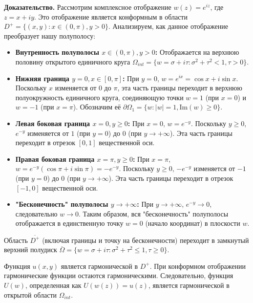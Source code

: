 \documentclass[12pt, a4paper]{article}
\begin{document}
	\textbf{Доказательство.}
	Рассмотрим комплексное отображение $w(z) = e^{iz}$, где $z = x+iy$. Это отображение является конформным в области $D^+ = \{(x,y): x \in (0,\pi), y > 0\}$. Анализируем, как данное отображение преобразует нашу полуполосу:
	\begin{itemize}
		\item \textbf{Внутренность полуполосы $x \in (0,\pi), y > 0$:} Отображается на верхнюю половину открытого единичного круга $\Omega_{int} = \{w = \sigma + i\tau : \sigma^2 + \tau^2 < 1, \tau > 0\}$.
		\item \textbf{Нижняя граница $y=0, x \in [0,\pi]$:} При $y=0$, $w = e^{ix} = \cos x + i\sin x$. Поскольку $x$ изменяется от $0$ до $\pi$, эта часть границы переходит в верхнюю полуокружность единичного круга, соединяющую точки $w=1$ (при $x=0$) и $w=-1$ (при $x=\pi$). Обозначим её $\partial \Omega_1 = \{w : |w|=1, \mathrm{Im}(w) \ge 0\}$.
		\item \textbf{Левая боковая граница $x=0, y \ge 0$:} При $x=0$, $w = e^{-y}$. Поскольку $y \ge 0$, $e^{-y}$ изменяется от $1$ (при $y=0$) до $0$ (при $y \to +\infty$). Эта часть границы переходит в отрезок $[0,1]$ вещественной оси.
		\item \textbf{Правая боковая граница $x=\pi, y \ge 0$:} При $x=\pi$, $w = e^{-y}(\cos\pi + i\sin\pi) = -e^{-y}$. Поскольку $y \ge 0$, $-e^{-y}$ изменяется от $-1$ (при $y=0$) до $0$ (при $y \to +\infty$). Эта часть границы переходит в отрезок $[-1,0]$ вещественной оси.
		\item \textbf{"Бесконечность" полуполосы $y \to +\infty$:} При $y \to +\infty$, $e^{-y} \to 0$, следовательно $w \to 0$. Таким образом, вся "бесконечность" полуполосы отображается в единственную точку $w=0$ (начало координат) в плоскости $w$.
	\end{itemize}
	Область $\overline{D^+}$ (включая границы и точку на бесконечности) переходит в замкнутый верхний полудиск $\overline{\Omega} = \{w = \sigma + i\tau : \sigma^2 + \tau^2 \le 1, \tau \ge 0\}$.
	
	Функция $u(x,y)$ является гармонической в $D^+$. При конформном отображении гармонические функции остаются гармоническими. Следовательно, функция $U(w)$, определенная как $U(w(z)) = u(z)$, является гармонической в открытой области $\Omega_{int}$.
	
\end{document}
